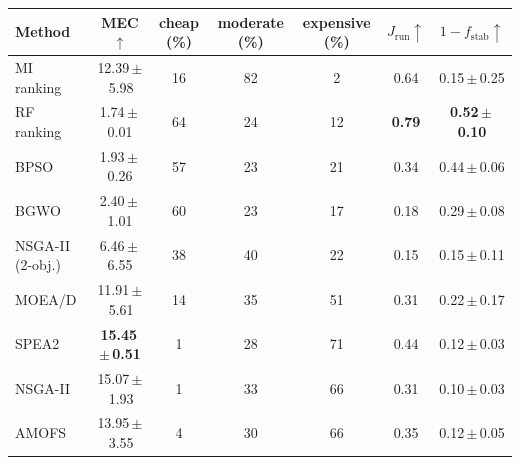 \begin{tabular}{lcccccc}
\toprule
Method & MEC$\uparrow$ & cheap (\%) & moderate (\%) & expensive (\%) & $J_{\mathrm{run}}\uparrow$ & $1-f_{\mathrm{stab}}\uparrow$ \\
\midrule
MI ranking & 12.39\,$\pm$\,5.98 & 16 & 82 & 2 & 0.64 & 0.15\,$\pm$\,0.25 \\
RF ranking & 1.74\,$\pm$\,0.01 & 64 & 24 & 12 & \textbf{0.79} & \textbf{0.52\,$\pm$\,0.10} \\
BPSO & 1.93\,$\pm$\,0.26 & 57 & 23 & 21 & 0.34 & 0.44\,$\pm$\,0.06 \\
BGWO & 2.40\,$\pm$\,1.01 & 60 & 23 & 17 & 0.18 & 0.29\,$\pm$\,0.08 \\
NSGA-II (2-obj.) & 6.46\,$\pm$\,6.55 & 38 & 40 & 22 & 0.15 & 0.15\,$\pm$\,0.11 \\
MOEA/D & 11.91\,$\pm$\,5.61 & 14 & 35 & 51 & 0.31 & 0.22\,$\pm$\,0.17 \\
SPEA2 & \textbf{15.45\,$\pm$\,0.51} & 1 & 28 & 71 & 0.44 & 0.12\,$\pm$\,0.03 \\
NSGA-II & 15.07\,$\pm$\,1.93 & 1 & 33 & 66 & 0.31 & 0.10\,$\pm$\,0.03 \\
AMOFS & 13.95\,$\pm$\,3.55 & 4 & 30 & 66 & 0.35 & 0.12\,$\pm$\,0.05 \\
\bottomrule
\end{tabular}

